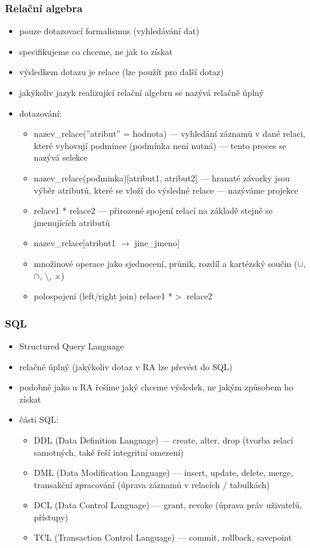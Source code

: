 \subsubsection*{Relační algebra}
\begin{itemize}
	\item pouze dotazovací formalismus (vyhledávání dat)
	\item specifikujeme co chceme, ne jak to získat
	\item výsledkem dotazu je relace (lze použít pro další dotaz)
	\item jakýkoliv jazyk realizující relační algebru se nazývá relačně úplný
	\item dotazování:
	\begin{itemize}
		\item nazev\_relace(''atribut'' = hodnota) --- vyhledání záznamů v dané relaci, které vyhovují podmínce (pod\-mín\-ka není nutná) --- tento proces se nazývá selekce 
		\item nazev\_relace(podminka)[atribut1, atribut2] --- hranaté závorky jsou výběr atributů, které se vloží do výsledné relace --- nazýváme projekce
		\item relace1 * relace2 --- přirozené spojení relací na základě stejně se jmenujících atributů
		\item nazev\_relace[atribut1 $\rightarrow$ jine\_jmeno]
		\item množinové operace jako sjednocení, průnik, rozdíl a kartézský součin ($\cup$, $\cap$, $\setminus$, $\times$)
		\item polospojení (left/right join) relace1 *$>$ relace2
	\end{itemize}
\end{itemize}

\subsubsection*{SQL}
\begin{itemize}
	\item Structured Query Language
	\item relačně úplný (jakýkoliv dotaz v RA lze převést do SQL)
	\item podobně jako u RA řešíme jaký chceme výsledek, ne jakým způsobem ho získat
	\item části SQL:
	\begin{itemize}
		\item DDL (Data Definition Language) --- create, alter, drop (tvorba relací samotných, také řeší integritní omezení)
		\item DML (Data Modification Language) --- insert, update, delete, merge, transakční zpracování (úprava záznamů v relacích / tabulkách)
		\item DCL (Data Control Language) --- grant, revoke (úprava práv uživatelů, přístupy)
		\item TCL (Transaction Control Language) --- commit, rollback, savepoint
	\end{itemize}
\end{itemize}

